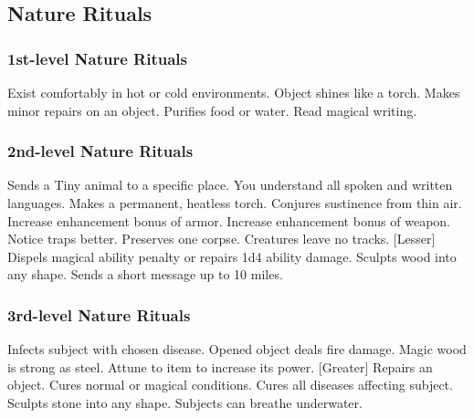 \subsection{Nature Rituals}\label{Nature Rituals}

\subsubsection{1st-level Nature Rituals}
\begin{rituallist}
     Exist comfortably in hot or cold environments.
     Object shines like a torch.
     Makes minor repairs on an object.
     Purifies food or water.
     Read magical writing.
\end{rituallist}

\subsubsection{2nd-level Nature Rituals}
\begin{rituallist}
     Sends a Tiny animal to a specific place.
     You understand all spoken and written languages.
     Makes a permanent, heatless torch.
     Conjures sustinence from thin air.
     Increase enhancement bonus of armor.
     Increase enhancement bonus of weapon.
     Notice traps better.
     Preserves one corpse.
     Creatures leave no tracks.
    [Lesser] Dispels magical ability penalty or repairs 1d4 ability damage.
     Sculpts wood into any shape.
     Sends a short message up to 10 miles.
\end{rituallist}

\subsubsection{3rd-level Nature Rituals}
\begin{rituallist}
     Infects subject with chosen disease.
     Opened object deals fire damage.
     Magic wood is strong as steel.
     Attune to item to increase its power.
    [Greater] Repairs an object.
     Cures normal or magical conditions.
     Cures all diseases affecting subject.
     Sculpts stone into any shape.
     Subjects can breathe underwater.
\end{rituallist}


